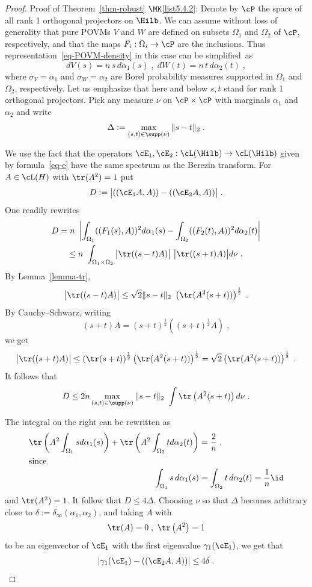 %
\begin{proof}{Proof of Theorem~\ref{thm-robust} $\MK$\eqref{list5.4.2}:}
Denote by $\cP$ the space of all rank 1 orthogonal projectors on $\Hilb$. We can assume without loss of generality that pure POVMs $V$ and $W$ are defined on subsets $\Omega_1$ and $\Omega_2$ of $\cP$, respectively, and that the maps $F_i: \Omega_i \to \cP$ are the inclusions. Thus representation~\eqref{eq-POVM-density} in this case can be simplified~as
\[
dV(s) = n\,s\,d\alpha_1(s)\;, \; dW(t) = n\,t\,d\alpha_2(t)\;,
\]
where $\sigma_V= \alpha_1$ and $\sigma_W=\alpha_2$ are Borel probability measures supported in $\Omega_1$ and $\Omega_2$, respectively. Let us emphasize that here and below $s,t$ stand for rank 1 orthogonal projectors. Pick any measure $\nu$ on $\cP \times \cP$ with marginals $\alpha_1$ and $\alpha_2$ and write
\[
\Delta:= \max_{(s,t) \in \supp(\nu) } \|s-t\|_2\;.
\]

We use the fact that the operators $\cE_1,\cE_2: \cL(\Hilb) \to \cL(\Hilb)$ given by formula~\eqref{eq-e} have the same spectrum as the Berezin transform. For $A \in \cL(H)$ with $\tr (A^2) =1$ put
\[
D:= \big|((\cE_1 A,A)) - ((\cE_2 A,A))\big|\;.
\]
One readily rewrites
\begin{multline*}
D = n \ \left | \int_{\Omega_1} ((F_1(s),A))^2d\alpha_1(s) - \int_{\Omega_2} ((F_2(t),A))^2d\alpha_2(t)\right |
\\
\leq n \ \int_{\Omega_1 \times \Omega_2} \big|\tr((s-t)A)\big|\ \big|\tr((s+t)A)\big| d\nu\;.
\end{multline*}
By Lemma~\ref{lemma-tr},
\[
\big|\tr((s-t)A)\big| \leq \sqrt{2}\|s-t\|_2\ \left(\tr(A^2(s+t))\right)^{\frac{1}{2}}\;.
\]
By Cauchy--Schwarz, writing
\[
(s+t)A = (s+t)^{\frac{1}{2}}\left((s+t)^{\frac{1}{2}}A\right)\;,
\]
we get
\[
\big|\tr((s+t)A)\big| \leq \left(\tr(s+t)\right)^{\frac{1}{2}}\left(\tr(A^2(s+t))\right)^{\frac{1}{2}} = \sqrt{2}\left(\tr(A^2(s+t))\right)^{\frac{1}{2}} \;.
\]
It follows that
\[
D \leq 2n\max_{(s,t) \in \supp(\nu)} \|s-t\|_2 \ \int \tr\left(A^2(s+t)\right) d\nu\;.
\]

\begingroup
The integral on the right can be rewritten as
\begin{align*}
\tr \left(A^2 \int_{\Omega_1} s d\alpha_1(s)\right) + \tr\left (A^2 \int_{\Omega_2} t d\alpha_2(t)\right)&= \frac{2}{n}\;,\\
\intertext{since}
\int_{\Omega_1} s\,d\alpha_1(s) &= \int_{\Omega_2} t\,d\alpha_2(t) = \frac{1}{n}\id
\end{align*}
and $\tr(A^2)=1$.
It follow that $D \leq 4\Delta$. Choosing $\nu$ so that $\Delta$ becomes arbitrary close to $\delta:= \delta_\infty(\alpha_1,\alpha_2)$, and taking $A$ with
\begin{equation}\label{eq-A-constraints}
\tr (A) =0\;,\ \tr\left(A^2\right)=1
\end{equation}
to be an eigenvector of $\cE_1$ with the first eigenvalue $\gamma_1(\cE_1)$, we get that
\[
|\gamma_1(\cE_1)- ((\cE_2 A,A))| \leq 4\delta\;.
\]
\endgroup


\end{proof}
